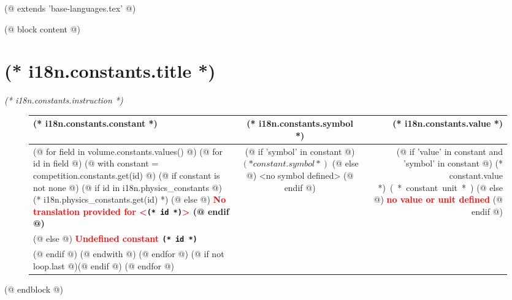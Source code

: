 (@ extends 'base-languages.tex' @)

(@ block content @)
    \pagestyle{constants}
    \renewcommand{\arraystretch}{1.3}
    \section{(* i18n.constants.title *)}
    \emph{(* i18n.constants.instruction *)}
    \vspace*{10mm}

    \begin{figure}[H]
        \centering
        \begin{tabular*}{\textwidth}{@{\extracolsep{\fill}} l c r}
            \toprule
                (* i18n.constants.constant *) & (* i18n.constants.symbol *) & (* i18n.constants.value *) \\
            \midrule
            (@ for field in volume.constants.values() @)
                (@ for id in field @)
                    (@ with constant = competition.constants.get(id) @)
                        (@ if constant is not none @)
                            (@ if id in i18n.physics_constants @)
                                (* i18n.physics_constants.get(id) *)
                            (@ else @)
                                \bf \textcolor{red}{No translation provided for <}\verb|(* id *)|\textcolor{red}{>}
                            (@ endif @) &
                            (@ if 'symbol' in constant @)
                                $(* constant.symbol *)$
                            (@ else @)
                                <no symbol defined>
                            (@ endif @) &
                            (@ if 'value' in constant and 'symbol' in constant @)
                                \SI{(* constant.value *)}{(* constant.unit *)}
                            (@ else @)
                                \textbf{\textcolor{red}{no value or unit defined}}
                            (@ endif @) \\
                        (@ else @)
                            \bf \textcolor{red}{Undefined constant} \verb|(* id *)| & & \\
                        (@ endif @)
                    (@ endwith @)
                (@ endfor @)
                (@ if not loop.last @)\midrule(@ endif @)
            (@ endfor @)
            \bottomrule
        \end{tabular*}
    \end{figure}
(@ endblock @)
